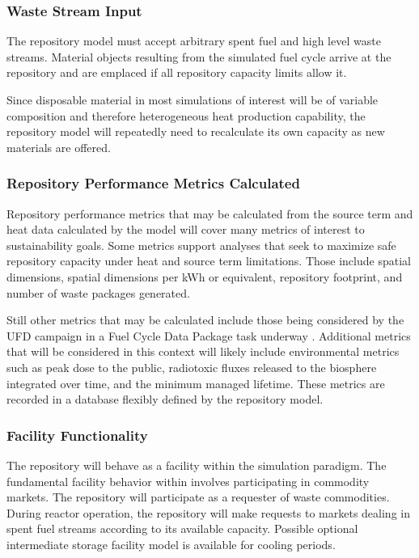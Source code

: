 \subsubsection{Waste Stream Input}

The repository model must accept arbitrary spent fuel and high level waste
streams.  Material objects resulting from the simulated fuel cycle arrive at 
the  repository and are emplaced if all repository capacity limits allow 
it.

Since disposable material in most simulations of interest will be of variable 
composition and therefore heterogeneous heat production capability, the 
repository model will repeatedly need to recalculate its own capacity as 
new materials are offered.

\subsubsection{Repository Performance Metrics Calculated}

Repository performance metrics that may be calculated from the source 
term and heat data calculated by the model will cover many metrics of
interest to sustainability goals. Some metrics support analyses that
seek to maximize safe repository capacity under heat and source term limitations. 
Those include spatial dimensions, spatial dimensions per kWh or equivalent,
repository footprint, and number of waste packages generated.

Still other metrics that may be calculated include those being considered by 
the \gls{UFD} campaign in a Fuel Cycle Data Package task underway 
\cite{nutt_personal_2011}. Additional metrics that will be considered in this
context will likely include environmental metrics such as peak dose 
to the public, radiotoxic fluxes released to the biosphere integrated over time, 
and the minimum managed lifetime.  These metrics are recorded in a database 
flexibly defined by the repository model. 

\subsubsection{Facility Functionality}

The repository will behave as a facility within the \Cyclus simulation 
paradigm. The fundamental facility behavior within \Cyclus involves 
participating in commodity markets. The repository will participate as 
a requester of waste commodities. During reactor operation, the 
repository will make requests to markets dealing in spent fuel streams 
according to its available capacity. Possible optional intermediate storage facility 
model is available for cooling periods.

